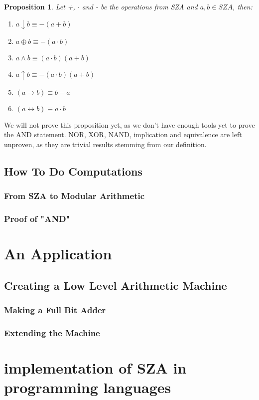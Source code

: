 \documentclass[12pt]{report}
\newtheorem{proposition}{Proposition}[section]
\theoremstyle{definition}
\theoremstyle{remark}
\begin{document}
      \begin{proposition}
        Let +, $\cdot$ and - be the operations from SZA and $a,b\in SZA$, then:
        \begin{enumerate}
          \item $a\downarrow b\equiv -(a+b)$
          \item $a\oplus b\equiv -(a\cdot b)$
          \item $a\wedge b\equiv (a\cdot b)(a+b)$
          \item $a\uparrow b\equiv -(a\cdot b)(a+b)$
          \item $(a\rightarrow b)\equiv b-a$
          \item $(a\leftrightarrow b)\equiv a\cdot b$
        \end{enumerate}
      \end{proposition}

      We will not prove this proposition yet, as we don't have enough tools yet to prove the AND statement. NOR, XOR, NAND, implication and equivalence are left unproven, as they are trivial results stemming from our definition.

  \section{How To Do Computations}
    \subsection{From SZA to Modular Arithmetic}
    \subsection{Proof of "AND"}

\newpage

\chapter{An Application}
  \section{Creating a Low Level Arithmetic Machine}
    \subsection{Making a Full Bit Adder}

    \subsection{Extending the Machine}

\newpage

\chapter{implementation of SZA in programming languages}
\end{document}
